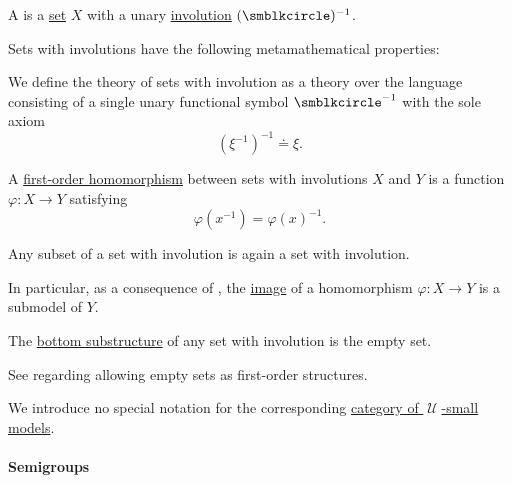 \begin{definition}\label{def:set_with_involution}\mimprovised
  A  is a \hyperref[def:set]{set} \( X \) with a unary \hyperref[def:involution]{involution} \( (\anon)^{-1} \).

  Sets with involutions have the following metamathematical properties:
  \begin{thmenum}
     We define the theory of sets with involution as a theory over the language consisting of a single unary functional symbol \( \anon^{-1} \) with the sole axiom
    \begin{equation}\label{eq:def:set_with_involution/theory/axiom}
      (\xi^{-1})^{-1} \doteq \xi.
    \end{equation}

     A \hyperref[def:first_order_homomorphism]{first-order homomorphism} between sets with involutions \( X \) and \( Y \) is a function \( \varphi: X \to Y \) satisfying
    \begin{equation}\label{eq:def:set_with_involution/homomorphism}
      \varphi(x^{-1})
      =
      \varphi(x)^{-1}.
    \end{equation}

     Any subset of a set with involution is again a set with involution.

    In particular, as a consequence of , the \hyperref[def:set_valued_map/image]{image} of a homomorphism \( \varphi: X \to Y \) is a submodel of \( Y \).

    The \hyperref[thm:substructures_form_complete_lattice/bottom]{bottom substructure} of any set with involution is the empty set.

    See  regarding allowing empty sets as first-order structures.

     We introduce no special notation for the corresponding \hyperref[def:category_of_small_first_order_models]{category of \( \mscrU \)-small models}.
  \end{thmenum}
\end{definition}

\paragraph{Semigroups}

